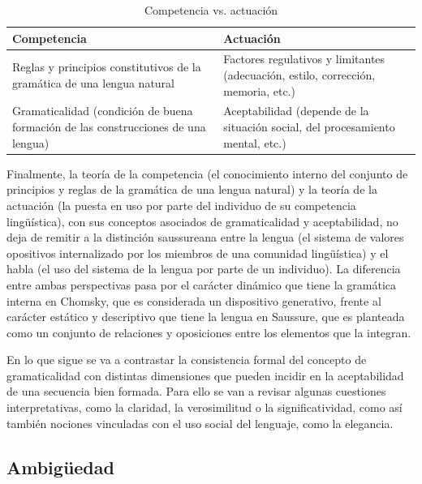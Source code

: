 \begin{table}[htbp]
  \centering
  \begin{tabularx}{\linewidth}{@{}L L@{}}
    \toprule
    \textbf{Competencia} & \textbf{Actuación} \\
    \midrule
    Reglas y principios constitutivos de la gramática de una lengua natural
      & Factores regulativos y limitantes (adecuación, estilo, corrección,
        memoria, etc.) \\
    \addlinespace
    Gramaticalidad (condición de buena formación de las construcciones de una
    lengua)
      & Aceptabilidad (depende de la situación social, del procesamiento
        mental, etc.) \\
    \bottomrule
  \end{tabularx}
  \caption{Competencia vs. actuación}\label{tab:02-competencia}
\end{table}

Finalmente, la teoría de la competencia (el conocimiento interno del conjunto de
principios y reglas de la gramática de una lengua natural) y la teoría de la
actuación (la puesta en uso por parte del individuo de su competencia
lingüística), con sus conceptos asociados de gramaticalidad y aceptabilidad, no
deja de remitir a la distinción saussureana entre la lengua (el sistema de
valores opositivos internalizado por los miembros de una comunidad lingüística)
y el habla (el uso del sistema de la lengua por parte de un individuo). La
diferencia entre ambas perspectivas pasa por el carácter dinámico que tiene la
gramática interna en Chomsky, que es considerada un dispositivo generativo,
frente al carácter estático y descriptivo que tiene la lengua en Saussure, que
es planteada como un conjunto de relaciones y oposiciones entre los elementos
que la integran.

En lo que sigue se va a contrastar la consistencia formal del concepto de
gramaticalidad con distintas dimensiones que pueden incidir en la aceptabilidad
de una secuencia bien formada. Para ello se van a revisar algunas cuestiones
interpretativas, como la claridad, la verosimilitud o la significatividad, como
así también nociones vinculadas con el uso social del lenguaje, como la
elegancia.

\subsection{Ambigüedad}\label{sec:02-ambiguedad}

